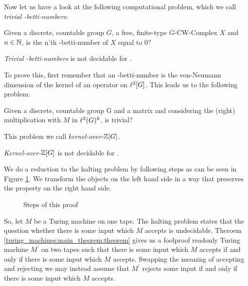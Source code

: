 
Now let us have a look at the following computational problem, which we call \emph{trivial \ltwo-betti-numbers}:

\begin{Problem}
	Given a discrete, countable group $G$, a free, finite-type $G$-CW-Complex $X$ and $n \in \mathbb{N}$, is the n'th \ltwo-betti-number of $X$ equal to 0?
\end{Problem}

\begin{Theorem}
	\label{zero-divisor-problem:trivial_betti_numbers}
	\emph{Trivial \ltwo-betti-numbers} is not decidable for .
\end{Theorem}

To prove this, first remember that an \ltwo-betti-number is the von-Neumann dimension of the kernel of an operator on $\ell^2[G]$.
This leads us to the following problem:

\begin{Problem}
	\label{the_zero_divisor_problem:zero_divisor_problem}
	Given a discrete, countable group G and a matrix 
	and considering the (right) multiplication with $M$ in $\ell^2(G)^k$, is  trivial?
\end{Problem}

This problem we call \emph{kernel-over-$\mathbb{Z}[G]$}.

\begin{Theorem}
	\label{zero-divisor-problem:kernel-over-zg}
	\emph{Kernel-over-$\mathbb{Z}[G]$} is not decidable for .
\end{Theorem}

\proof
	We do a reduction to the halting problem by following steps as can be seen in Figure \ref{zero_divisor_problem:main_theorem:fig_proof_plan}.
	We transform the objects on the left hand side in a way that preserves the property on the right hand side.

	\begin{figure}[h]
		\centering
		
		\caption{Steps of this proof}
		\label{zero_divisor_problem:main_theorem:fig_proof_plan}
	\end{figure}

	So, let $M$ be a Turing machine on one tape.
	The halting problem states that the question whether there is some input which $M$ accepts is undecidable.
	Theroem \ref{turing_machines:main_theorem:theorem} gives us a foolproof readonly Turing machine $M^\prime$ on two tapes such that there is some input which $M$ accepts if and only if there is some input which $M$ accepts.\footnotemark
	Swapping the meaning of accepting and rejecting we may instead assume that $M^\prime$ rejects some input if and only if there is some input which $M$ accepts.

